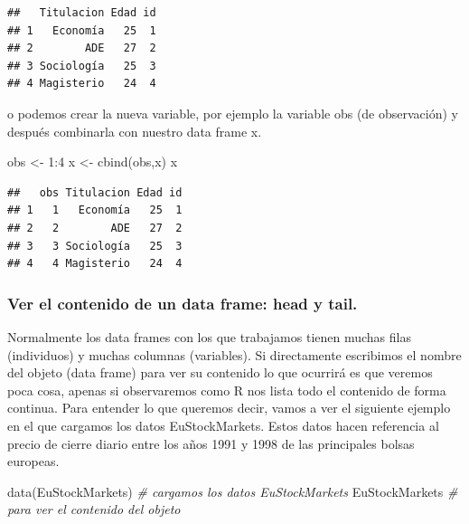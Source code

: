 \documentclass[
]{book}
\newenvironment{Shaded}{\begin{snugshade}}{\end{snugshade}}
\newcommand{\CommentTok}[1]{\textcolor[rgb]{0.56,0.35,0.01}{\textit{#1}}}
\newcommand{\DecValTok}[1]{\textcolor[rgb]{0.00,0.00,0.81}{#1}}
\newcommand{\FunctionTok}[1]{\textcolor[rgb]{0.00,0.00,0.00}{#1}}
\newcommand{\NormalTok}[1]{#1}
\newcommand{\OtherTok}[1]{\textcolor[rgb]{0.56,0.35,0.01}{#1}}
\newcommand{\SpecialCharTok}[1]{\textcolor[rgb]{0.00,0.00,0.00}{#1}}
\begin{document}
\begin{Shaded}
\end{Shaded}

\begin{verbatim}
##   Titulacion Edad id
## 1   Economía   25  1
## 2        ADE   27  2
## 3 Sociología   25  3
## 4 Magisterio   24  4
\end{verbatim}

o podemos crear la nueva variable, por ejemplo la variable obs (de observación) y después combinarla con nuestro data frame x.

\begin{Shaded}
\begin{Highlighting}[]
\NormalTok{obs }\OtherTok{\textless{}{-}} \DecValTok{1}\SpecialCharTok{:}\DecValTok{4}
\NormalTok{x }\OtherTok{\textless{}{-}} \FunctionTok{cbind}\NormalTok{(obs,x)}
\NormalTok{x}
\end{Highlighting}
\end{Shaded}

\begin{verbatim}
##   obs Titulacion Edad id
## 1   1   Economía   25  1
## 2   2        ADE   27  2
## 3   3 Sociología   25  3
## 4   4 Magisterio   24  4
\end{verbatim}

\hypertarget{ver-el-contenido-de-un-data-frame-head-y-tail.}{%
\subsubsection{Ver el contenido de un data frame: head y tail.}\label{ver-el-contenido-de-un-data-frame-head-y-tail.}}

Normalmente los data frames con los que trabajamos tienen muchas filas (individuos) y muchas columnas (variables). Si directamente escribimos el nombre del objeto (data frame) para ver su contenido lo que ocurrirá es que veremos poca cosa, apenas si observaremos como R nos lista todo el contenido de forma continua. Para entender lo que queremos decir, vamos a ver el siguiente ejemplo en el que cargamos los datos EuStockMarkets. Estos datos hacen referencia al precio de cierre diario entre los años 1991 y 1998 de las principales bolsas europeas.

\begin{Shaded}
\begin{Highlighting}[]
\FunctionTok{data}\NormalTok{(EuStockMarkets)        }\CommentTok{\# cargamos los datos EuStockMarkets}
\NormalTok{EuStockMarkets              }\CommentTok{\# para ver el contenido del objeto}
\end{Highlighting}
\end{Shaded}
\end{document}
